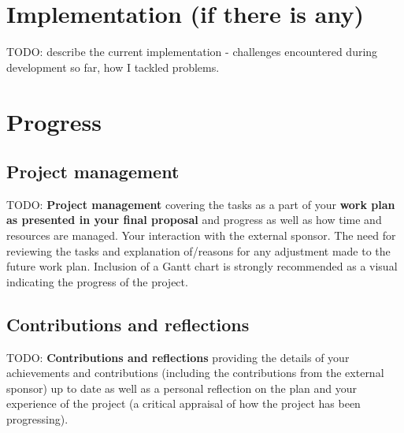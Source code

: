 \documentclass{article}
\begin{document}
\section{Implementation (if there is any)}
TODO: describe the current implementation - challenges encountered during
development so far, how I tackled problems.


\section{Progress}
\subsection{Project management}
TODO: \textbf{Project management} covering the tasks as a part of your
\textbf{work plan as presented in your final proposal} and progress as well as
how time and resources are managed. Your interaction with the external sponsor.
The need for reviewing the tasks and explanation of/reasons for any adjustment
made to the future work plan. Inclusion of a Gantt chart is strongly
recommended as a visual indicating the progress of the project.


\subsection{Contributions and reflections}
TODO: \textbf{Contributions and reflections} providing the details of your
achievements and contributions (including the contributions from the external
sponsor) up to date as well as a personal reflection on the plan and your
experience of the project (a critical appraisal of how the project has been
progressing).


\nocite{design-of-unix-os}
\nocite{osdev-wiki}
\nocite{unix-prog-env}
\printbibliography
\end{document}
